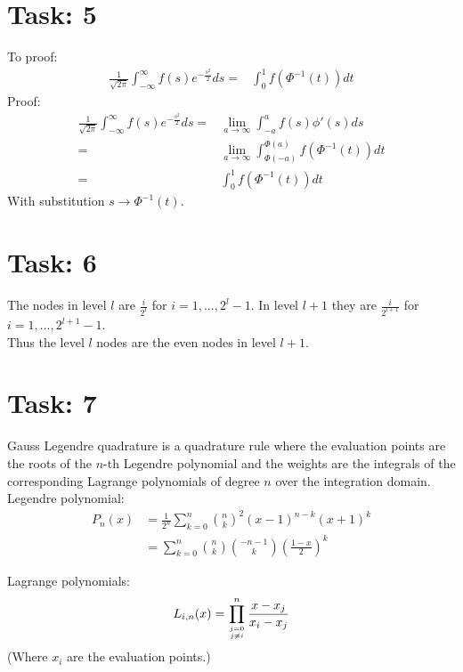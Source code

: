\documentclass{article}
\begin{document}
\section*{Task: 5}

\noindent To proof:
\begin{align*}
 \frac{1}{\sqrt{2 \pi}} \int_{-\infty}^\infty f(s)e^{-\frac{s^2}{2}}ds =& \int_{0}^1 f(\Phi^{-1}(t))dt
\end{align*}
Proof:
\begin{align*}
 \frac{1}{\sqrt{2 \pi}} \int_{-\infty}^\infty f(s)e^{-\frac{s^2}{2}}ds =& \lim_{a\rightarrow \infty}\int_{-a}^a f(s) \phi '(s)ds\\
  =& \lim_{a\rightarrow \infty}\int_{\Phi(-a)}^{\Phi(a)} f(\Phi^{-1}(t)) dt\\
  =& \int_{0}^{1} f(\Phi^{-1}(t)) dt
\end{align*}
With substitution $s\rightarrow \Phi^{-1}(t)$.
\flushright{$\qed$}

\section*{Task: 6}

The nodes in level $l$ are $\frac{i}{2^l}$ for $i=1,...,2^l-1$.
In level $l + 1$ they are $\frac{i}{2^{l+1}}$ for $i=1,...,2^{l+1}-1$.\\
Thus the level $l$ nodes are the even nodes in level $l+1$.

\section*{Task: 7}

\noindent Gauss Legendre quadrature is a quadrature rule where the evaluation points are the roots of the
$n$-th Legendre polynomial and the weights are the integrals of the corresponding Lagrange polynomials of degree $n$ over the integration domain.\\

\noindent Legendre polynomial:
\begin{align*}
 P_n(x)&=\frac{1}{2^n}\sum_{k=0}^n {n \choose k}^2 (x-1)^{n-k}(x+1)^k \\
 &= \sum_{k=0}^n {n \choose k}{-n-1 \choose k}\left(\frac{1-x}{2}\right)^k
\end{align*}

\noindent Lagrange polynomials:
\begin{align*}
 L_{i,n}(x)=\prod_{j=0 \atop j\neq i}^n \frac{x-x_j}{x_i-x_j}
\end{align*}
(Where $x_i$ are the evaluation points.)
\end{document}
